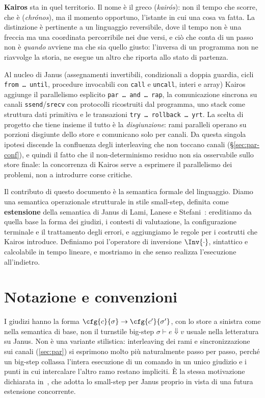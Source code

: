 \medskip
\noindent
\textbf{Kairos} sta in quel territorio. Il nome è il greco
\kairosgr{} (\emph{kairós}): non il tempo che scorre, che è \chronosgr{}
(\emph{chrónos}), ma il momento opportuno, l'istante in cui una cosa va fatta. La distinzione è
pertinente a un linguaggio reversibile, dove il tempo non è una freccia ma una
coordinata percorribile nei due versi, e ciò che conta di un passo non è
\emph{quando} avviene ma che sia quello giusto: l'inversa di un programma non ne
riavvolge la storia, ne esegue un altro che riporta allo stato di partenza.

Al nucleo di Janus (assegnamenti invertibili, condizionali a doppia guardia,
cicli \texttt{from\,\dots\,until}, procedure invocabili con \texttt{call} e
\texttt{uncall}, interi e array) Kairos aggiunge il parallelismo esplicito
\texttt{par\,\dots\,and\,\dots\,rap}, la comunicazione sincrona su canali
\texttt{ssend}/\texttt{srecv} con protocolli ricostruiti dal programma, uno stack come struttura dati primitiva
e le transazioni \texttt{try\,\dots\,rollback\,\dots\,yrt}.
La scelta di progetto che tiene insieme il tutto è la \emph{disgiunzione}: rami
paralleli operano su porzioni disgiunte dello store e comunicano solo per
canali. Da questa singola ipotesi discende la confluenza degli interleaving che
non toccano canali (\S\ref{sec:par-conf}), e quindi il fatto che il
non-determinismo residuo non sia osservabile sullo store finale: la
concorrenza di Kairos serve a esprimere il parallelismo dei problemi, non a
introdurre corse critiche.

\medskip
\noindent
Il contributo di questo documento è la semantica formale del linguaggio.
Diamo una semantica operazionale strutturale in stile small-step, definita come
\textbf{estensione} della semantica di Janus di Lami, Lanese e
Stefani~\cite{LamiLaneseStefani2024}: ereditiamo da quella base la forma dei
giudizi, i contesti di valutazione, la configurazione terminale e il
trattamento degli errori, e aggiungiamo le regole per i costrutti che Kairos
introduce. Definiamo poi l'operatore di inversione $\Inv{\cdot}$, sintattico e
calcolabile in tempo lineare, e mostriamo in che senso realizza l'esecuzione
all'indietro.

\section{Notazione e convenzioni}
\label{sec:notazione}

I giudizi hanno la forma $\cfg{c}{\sigma} \to \cfg{c'}{\sigma'}$, con lo store a
sinistra come nella semantica di base, non il turnstile big-step
$\sigma \vdash e \Downarrow v$ usuale nella letteratura su Janus. Non è una
variante stilistica: interleaving dei rami e sincronizzazione sui canali
(\cref{sec:par}) si esprimono molto più naturalmente passo per passo, perché un
big-step collassa l'intera esecuzione di un comando in un unico giudizio e i
punti in cui intercalare l'altro ramo restano impliciti. È la stessa motivazione
dichiarata in~\cite{LamiLaneseStefani2024}, che adotta lo small-step per Janus
proprio in vista di una futura estensione concorrente.

